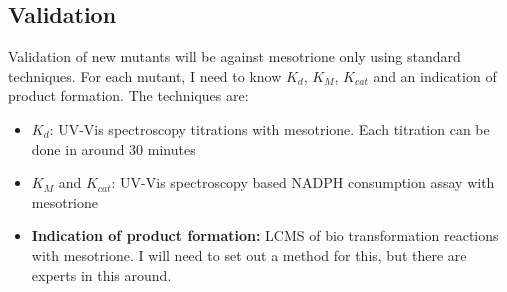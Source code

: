 \documentclass{article}
\begin{document}
\subsection{Validation}
Validation of new mutants will be against mesotrione only using standard techniques. For each mutant, I need to know $K_d$, $K_M$, $K_{cat}$ and an indication of product formation. The techniques are:
\begin{itemize}
	\item $K_d$: UV-Vis spectroscopy titrations with mesotrione. Each titration can be done in around 30 minutes
	\item $K_M$ and $K_{cat}$: UV-Vis spectroscopy based NADPH consumption assay with mesotrione 
	\item \textbf{Indication of product formation: } LCMS of bio transformation reactions with mesotrione. I will need to set out a method for this, but there are experts in this around.
\end{itemize}
\end{document}
